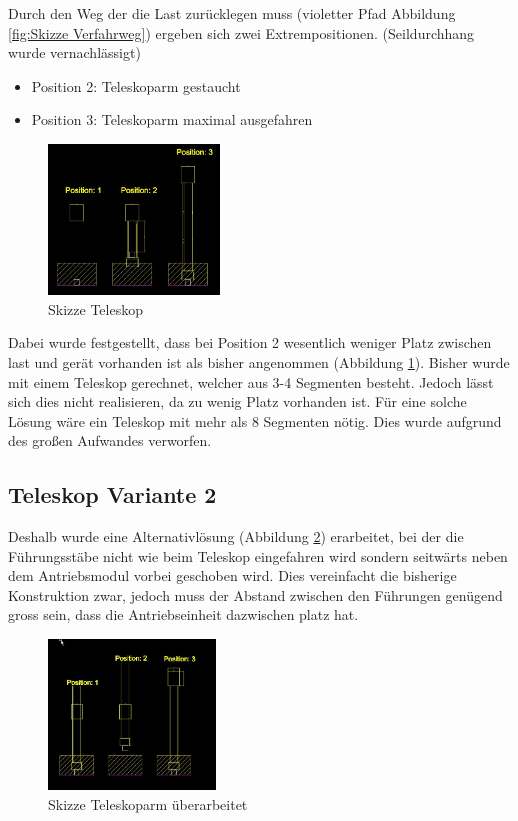 \documentclass[a4paper]{report}
\begin{document}
Durch den Weg der die Last zurücklegen muss (violetter Pfad Abbildung \ref{fig:Skizze Verfahrweg}) ergeben sich zwei Extrempositionen.
(Seildurchhang wurde vernachlässigt)


\begin{itemize}[noitemsep]
	\item Position 2: Teleskoparm gestaucht
	\item Position 3: Teleskoparm maximal ausgefahren
\end{itemize}


\begin{figure}[h]
	\centering
	\includegraphics[keepaspectratio,height=4cm]{Teleskoparm2.JPG}
	\caption{Skizze Teleskop}
	\label{fig:Teleskoparm}
\end{figure}

Dabei wurde festgestellt, dass bei Position 2 wesentlich weniger Platz zwischen last und gerät vorhanden ist als bisher angenommen (Abbildung \ref{fig:Teleskoparm}). Bisher wurde mit einem Teleskop gerechnet, welcher aus 3-4 Segmenten besteht. Jedoch lässt sich dies nicht realisieren, da zu wenig Platz vorhanden ist. Für eine solche Lösung wäre ein Teleskop mit mehr als 8 Segmenten nötig. Dies wurde aufgrund des großen Aufwandes verworfen.

\subsection{Teleskop Variante 2}
\label{app:ssec:Teleskopje2}
Deshalb wurde eine Alternativlösung (Abbildung \ref{fig:Linearaufzug}) erarbeitet, bei der die Führungsstäbe nicht wie beim Teleskop eingefahren wird sondern seitwärts neben dem Antriebsmodul vorbei geschoben wird. Dies vereinfacht die bisherige Konstruktion zwar, jedoch muss der Abstand zwischen den Führungen genügend gross sein, dass die Antriebseinheit dazwischen platz hat.

\begin{figure}[h]
	\centering
	\includegraphics[keepaspectratio,height=4cm]{Teleskoparm3.JPG}
	\caption{Skizze Teleskoparm überarbeitet}
	\label{fig:Linearaufzug}
\end{figure}
\end{document}
